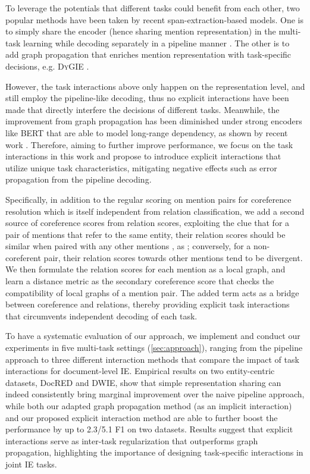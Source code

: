\documentclass[11pt]{article}
\begin{document}
To leverage the potentials that different tasks could benefit from each other, two popular methods have been taken by recent span-extraction-based models.
One is to simply share the encoder (hence sharing mention representation) in the multi-task learning while decoding separately in a pipeline manner \cite{scierc,hierarchical-multi}.
The other is to add graph propagation that enriches mention representation with task-specific decisions, e.g. D\textsc{y}GIE \citep{dygie}.

However, the task interactions above only happen on the representation level, and still employ the pipeline-like decoding, thus no explicit interactions have been made that directly interfere the decisions of different tasks.
Meanwhile, the improvement from graph propagation has been diminished under strong encoders like BERT \citep{joshi-etal-2019-bert} that are able to model long-range dependency, as shown by recent work \citep{dygie++,xu-choi-2020-revealing,dwie}.
Therefore, aiming to further improve performance, we focus on the task interactions in this work and propose to introduce explicit interactions that utilize unique task characteristics, mitigating negative effects such as error propagation from the pipeline decoding.

Specifically, in addition to the regular scoring on mention pairs for coreference resolution which is itself independent from relation classification, we add a second source of coreference scores from relation scores, exploiting the clue that for a pair of mentions  that refer to the same entity, their relation scores  should be similar when paired with any other mentions , as ; conversely, for a non-coreferent pair, their relation scores towards other mentions tend to be divergent.
We then formulate the relation scores  for each mention as a local graph, and learn a distance metric as the secondary coreference score that checks the compatibility of local graphs of a mention pair.
The added term acts as a bridge between coreference and relations, thereby providing explicit task interactions that circumvents independent decoding of each task.

To have a systematic evaluation of our approach, we implement and conduct our experiments in five multi-task settings (\textsection\ref{sec:approach}), ranging from the pipeline approach to three different interaction methods that compare the impact of task interactions for document-level IE. Empirical results on two entity-centric datasets, DocRED and DWIE, show that simple representation sharing can indeed consistently bring marginal improvement over the naive pipeline approach, while both our adapted graph propagation method (as an implicit interaction) and our proposed explicit interaction method are able to further boost the performance by up to 2.3/5.1 F1 on two datasets. Results suggest that explicit interactions serve as inter-task regularization that outperforms graph propagation, highlighting the importance of designing task-specific interactions in joint IE tasks.
\end{document}
